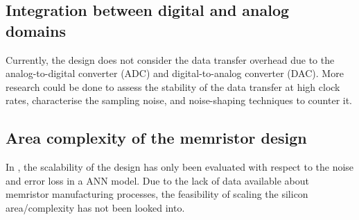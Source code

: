 
\subsection{Integration between digital and analog domains}

Currently, the design does not consider the data transfer overhead due to the analog-to-digital converter (ADC) and digital-to-analog converter (DAC). More research could be done to assess the stability of the data transfer at high clock rates, characterise the sampling noise, and noise-shaping techniques to counter it.

\subsection{Area complexity of the memristor design}

In , the scalability of the design has only been evaluated with respect to the noise and error loss in a \ac{ANN} model. Due to the lack of data available about memristor manufacturing processes, the feasibility of scaling the silicon area/complexity has not been looked into.
